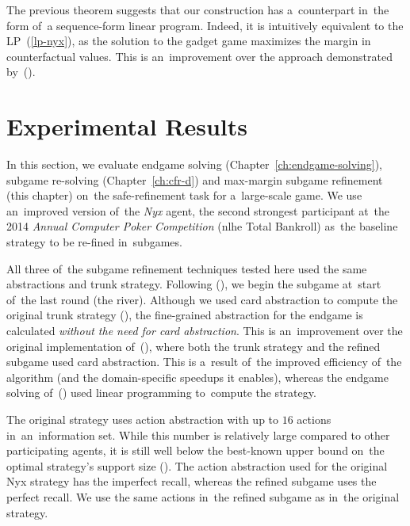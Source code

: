 The previous theorem suggests that our construction has a~counterpart in~the form of~a sequence-form linear program.
Indeed, it is intuitively equivalent to the LP~(\ref{lp-nyx}), as the solution to the gadget game maximizes the margin in counterfactual values.
This is an~improvement over the approach demonstrated by~(\cite{BurchJohansonBowling2014}).
\color{black}

\section{Experimental Results}
\label{sec:max-margin-experiments}
In this section, we evaluate endgame solving (Chapter~\ref{ch:endgame-solving}), subgame re-solving (Chapter~\ref{ch:cfr-d}) and max-margin subgame refinement (this chapter) on~the safe-refinement task for a~large-scale game.
We use an~improved version of~the \emph{Nyx} agent, the second strongest participant at~the 2014 \emph{Annual Computer Poker Competition} (\acrlong{nlhe} Total Bankroll)\footnotemark{} as~the baseline strategy to be re-fined in~subgames.

All three of~the subgame refinement techniques tested here used the same abstractions and trunk strategy.
Following (\cite{Ganzfried2015endgame}), we begin the subgame at~start of~the last round (the river).
Although we used card abstraction to compute the original trunk strategy (\cite{Schmid2015automatic, Johanson2013evaluating}), the fine-grained abstraction for the endgame is calculated \emph{without the need for card abstraction}.
This is an~improvement over the original implementation of~(\cite{Ganzfried2015endgame}), where both the trunk strategy and the refined subgame used card abstraction.
This is a~result of~the improved efficiency of~the \cfrplus algorithm (and the domain-specific speedups it enables), whereas the endgame solving of~(\cite{Ganzfried2015endgame}) used linear programming to~compute the strategy.

The original strategy uses action abstraction with up to $16$ actions in~an~information set.
While this number is relatively large compared to other participating agents, it is still well below the best-known upper bound on~the optimal strategy's  support size (\cite{Schmid2014bounding}).
The action abstraction used for the original Nyx strategy has the imperfect recall, whereas the refined subgame uses the perfect recall.
We use the same actions in~the refined subgame as in~the original strategy.

